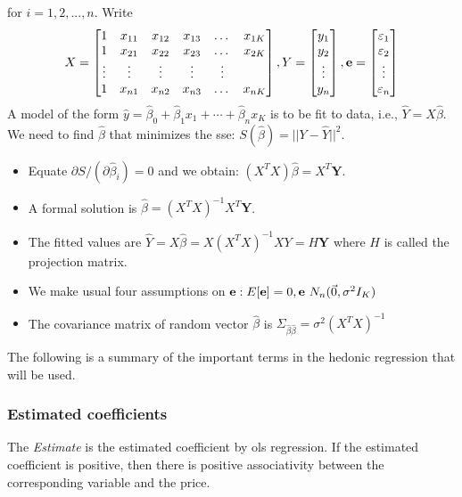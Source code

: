 \documentclass[12pt]{article}
\begin{document}
for $i=1, 2, ..., n$. 
Write 
$$X=\begin{bmatrix}
    1   & x_{11}       & x_{12} & x_{13} & \dots & x_{1K} \\
    1   & x_{21}       & x_{22} & x_{23} & \dots & x_{2K} \\
    \vdots   & \vdots & \vdots &\vdots &\vdots \\
    1 & x_{n1}       & x_{n2} & x_{n3} & \dots & x_{nK}
\end{bmatrix}, Y=\begin{bmatrix}
y_1\\
y_2\\
\vdots\\
y_n
\end{bmatrix}, \textrm{\textbf{e}}=\begin{bmatrix}
\varepsilon_1\\
\varepsilon_2\\
\vdots\\
\varepsilon_n
\end{bmatrix}$$
A model of the form
$\hat y=\hat \beta_0+\hat \beta_1 x_1+\cdots +\hat \beta_n x_K$
is to be fit to data, i.e., $\hat Y=X\hat \beta$. We need to find $\hat \beta $ that minimizes the \acrfull{sse}: $S(\hat \beta)=||Y-\hat Y||^2$.
\begin{itemize}
    \item Equate $\partial S/(\partial \hat \beta_i )=0$ and we obtain: $(X^T X) \hat \beta=X^T \textbf{Y}$.
    \item A formal solution is $\hat \beta=(X^T X)^{-1} X^T \textbf{Y}$. 
    \item The fitted values are $\hat Y=X\hat \beta=X(X^T X)^{-1}XY=H\textbf{Y}$ where $H$ is called the projection matrix.
    
    \item We make usual four assumptions on $\textrm{\textbf{e}}: E[\textbf{\textrm{e}}]=0, \textbf{\textrm{e}}~N_n(\vec 0, \sigma^2 I_K)$
    \item The covariance matrix of random vector $\hat \beta$ is $\Sigma_{\hat \beta \hat \beta}=\sigma^2 (X^T X)^{-1}$
\end{itemize}

The following is a summary of the important terms in the hedonic regression that will be used.
\subsubsection{Estimated coefficients} The \textit{Estimate} is the estimated coefficient by \acrshort{ols} regression. If the estimated coefficient is positive, then there is positive associativity between the corresponding variable and the price.
\end{document}

